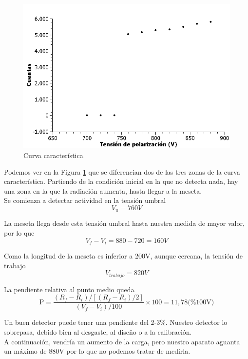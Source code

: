 \documentclass[a4paper,12pt,spanish]{article}
\begin{document}
	
	\begin{figure}[H]
		\centering
		\includegraphics[width=1\linewidth]{imagenes/curva-caracteristica-cuentas-tension}
		\caption{Curva característica}
		\label{fig:curva-caracteristica-cuentas-tension}
	\end{figure}
	
	Podemos ver en la Figura \ref{fig:curva-caracteristica-cuentas-tension} que se diferencian dos de las tres zonas de la curva característica. Partiendo de la condición inicial en la que no detecta nada, hay una zona en la que la radiación aumenta, hasta llegar a la meseta. \\
	
	
	Se comienza a detectar actividad en la tensión umbral 
	\[V_u = 760  \si{V}  \]
	
	
	La meseta llega desde esta tensión umbral hasta nuestra medida de mayor valor, por lo que 
	\[V_f - V_i = 880 - 720 = 160 \si{V}\]
	
	Como la longitud de la meseta es inferior a 200V, aunque cercana, la tensión de trabajo
	\[V_{trabajo} = 820\si{V}\]
	
	La pendiente relativa al punto medio queda 
	\[ \text{P} = \frac{(R_f- R_i)/[(R_f-R_i)/2]}{(V_f - V_i)/100} \times 100 = 11,78 \text{(\% 100V)}
	\]
	
	Un buen detector puede tener una pendiente del 2-3\%. Nuestro detector lo sobrepasa, debido bien al desgaste, al diseño o a la calibración.\\
	
	A continuación, vendría un aumento de la carga, pero nuestro aparato aguanta un máximo de 880V por lo que no podemos tratar de medirla. 
	
\end{document}
